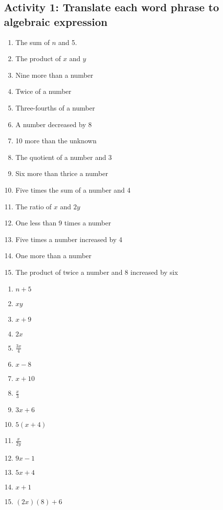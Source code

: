 \subsection*{Activity 1: Translate each word phrase to algebraic expression}
\begin{enumerate}
\item The sum of $n$ and 5. 
\item The product of $x$ and $y$ 
\item Nine more than a number 
\item Twice of a number 
\item Three-fourths of a number 
\item A number decreased by 8 
\item 10 more than the unknown 
\item The quotient of a number and 3 
\item Six more than thrice a number 
\item Five times the sum of a number and 4 
\item The ratio of $x$ and $2y$
\item One less than 9 times a number 
\item Five times a number increased by 4 
\item One more than a number 
\item The product of twice a number and 8 increased by six 
\end{enumerate}
\Answers
\begin{enumerate}
\item $n+5$
\item $xy$
\item $x+9$
\item $2x$
\item $\frac{3x}{4}$
\item $x-8$
\item $x + 10$
\item $\frac{x}{3}$
\item $3x + 6$
\item $5(x +4)$
\item $\frac{x}{2y}$
\item $9x-1$
\item $5x + 4$
\item $x+1$
\item $(2x)(8) + 6$
\end{enumerate}
